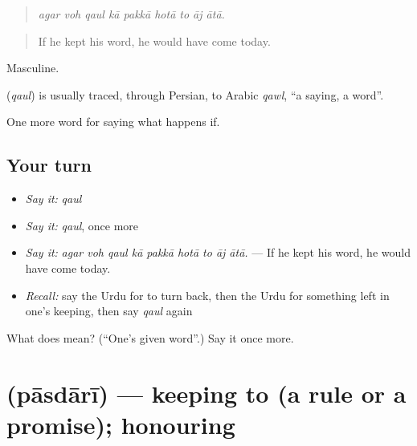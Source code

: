 \begin{quote}
        
\end{quote}

\begin{quote}
\emph{agar voh qaul kā pakkā hotā to āj ātā.}
\end{quote}

\begin{quote}
If he kept his word, he would have come today.
\end{quote}

Masculine.

\begin{cousinweb}
\textbf{} (\emph{qaul}) is usually traced, through Persian, to Arabic \emph{qawl}, \textquotedblleft{}a saying, a word\textquotedblright{}.
\end{cousinweb}

\begin{grammarlens}[title={What you've built}]
One more word for saying what happens if.
\end{grammarlens}

\subsection*{Your turn}
\begin{itemize}
\raggedright
  \item \emph{Say it:} \emph{qaul}
  \item \emph{Say it:} \emph{qaul}, once more
  \item \emph{Say it:} \emph{agar voh qaul kā pakkā hotā to āj ātā.} — If he kept his word, he would have come today.
  \item \emph{Recall:} say the Urdu for to turn back, then the Urdu for something left in one's keeping, then say \emph{qaul} again
\end{itemize}

\begin{tcolorbox}[breakable,colback=teal!4,colframe=teal!35!black,title={Before you move on}]
What does  mean? (\textquotedblleft{}One's given word\textquotedblright{}.) Say it once more.
\end{tcolorbox}
\section[\texorpdfstring{\ur{پاسداری} (pāsdārī)}{پاسداری (pāsdārī)}]{ (pāsdārī) — keeping to (a rule or a promise); honouring}

